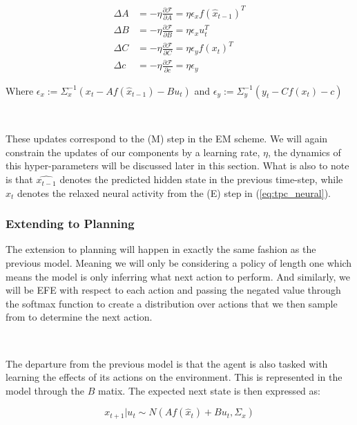 \documentclass{article}
\newcommand{\refp}[1]{(\ref{#1})}
\begin{document}
\begin{equation}
    \begin{aligned}
        \Delta A &= -\eta \frac{\partial \mathcal{F}}{\partial A} = \eta \epsilon_x f\left(\hat{x}_{t-1}\right)^T \\
        \Delta B &= -\eta \frac{\partial \mathcal{F}}{\partial B} = \eta \epsilon_x u_t^T \\
        \Delta C &= -\eta \frac{\partial \mathcal{F}}{\partial C} = \eta \epsilon_y f\left(x_t\right)^T \\
        \Delta c &= -\eta \frac{\partial \mathcal{F}}{\partial c} = \eta \epsilon_y
    \end{aligned}
\end{equation}

Where $\epsilon_x := \Sigma_x^{-1}(x_t - A f(\hat{x}_{t-1}) - Bu_t)$ and $\epsilon_y := \Sigma_y^{-1}(y_t - C f(x_t) - c)$

\

These updates correspond to the (M) step in the EM scheme. We will again constrain the updates of our components by a learning rate, $\eta$, the dynamics of this hyper-parameters will be discussed later in this section. What is also to note is that $\hat{x_{t-1}}$ denotes the predicted hidden state in the previous time-step, while $x_t$ denotes the relaxed neural activity from the (E) step in \refp{eq:tpc_neural}. 

\subsubsection{Extending to Planning}

The extension to planning will happen in exactly the same fashion as the previous model. Meaning we will only be considering a policy of length one which means the model is only inferring what next action to perform. And similarly, we will be EFE with respect to each action and passing the negated value through the softmax function to create a distribution over actions that we then sample from to determine the next action. 

\

The departure from the previous model is that the agent is also tasked with learning the effects of its actions on the environment. This is represented in the model through the $B$ matix. The expected next state is then expressed as:

\begin{equation}
	x_{t+1} | u_t \sim N(A f(\hat{x}_{t}) + B u_{t}, \Sigma_x)
\end{equation}
\end{document}
